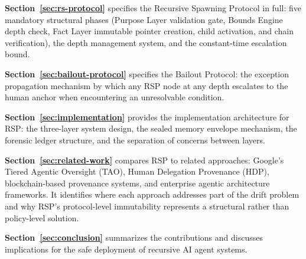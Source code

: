 \textbf{Section~\ref{sec:rs-protocol}} specifies the Recursive Spawning Protocol in full: five mandatory structural phases (Purpose Layer validation gate, Bounds Engine depth check, Fact Layer immutable pointer creation, child activation, and chain verification), the depth management system, and the constant-time escalation bound.

\textbf{Section~\ref{sec:bailout-protocol}} specifies the Bailout Protocol: the exception propagation mechanism by which any RSP node at any depth escalates to the human anchor when encountering an unresolvable condition.

\textbf{Section~\ref{sec:implementation}} provides the implementation architecture for RSP: the three-layer system design, the sealed memory envelope mechanism, the forensic ledger structure, and the separation of concerns between layers.

\textbf{Section~\ref{sec:related-work}} compares RSP to related approaches: Google's Tiered Agentic Oversight (TAO), Human Delegation Provenance (HDP), blockchain-based provenance systems, and enterprise agentic architecture frameworks. It identifies where each approach addresses part of the drift problem and why RSP's protocol-level immutability represents a structural rather than policy-level solution.

\textbf{Section~\ref{sec:conclusion}} summarizes the contributions and discusses implications for the safe deployment of recursive AI agent systems.